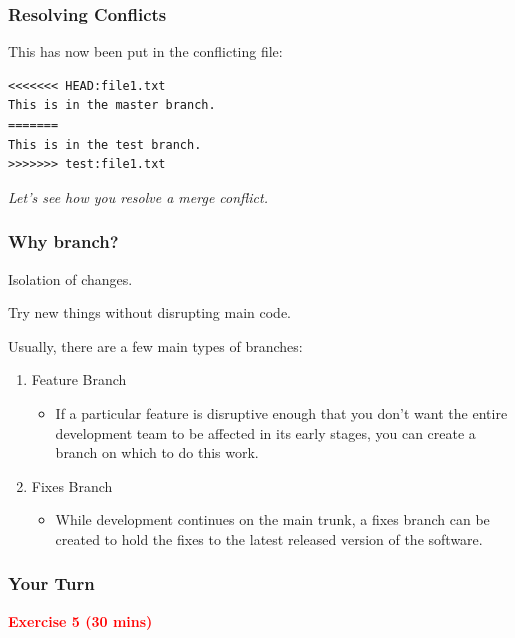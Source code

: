 \documentclass{beamer}
\begin{document}
\begin{frame}[fragile]
\frametitle{Resolving Conflicts}
This has now been put in the conflicting file:
\begin{verbatim}
<<<<<<< HEAD:file1.txt
This is in the master branch.
=======
This is in the test branch.
>>>>>>> test:file1.txt
\end{verbatim}\pause
\textit{Let's see how you resolve a merge conflict.}
\end{frame}


\begin{frame}
\frametitle{Why branch?}
\begin{center}
Isolation of changes. \pause
\vspace{15pt}

Try new things without disrupting main code. 
\end{center} \pause

Usually, there are a few main types of branches:
\begin{enumerate}
\item Feature Branch
\begin{itemize}
\item If a particular feature is disruptive enough that you don't want the entire development team to be affected in its early stages, you can create a branch on which to do this work.
\end{itemize}
\item Fixes Branch
\begin{itemize}
\item While development continues on the main trunk, a fixes branch can be created to hold the fixes to the latest released version of the software.
\end{itemize}
\end{enumerate} 
\end{frame}


\begin{frame}
\frametitle{Your Turn}
\begin{center}
\textbf{\textcolor{red}{Exercise 5 (30 mins)}}
\end{center}
\end{frame}
\end{document}
